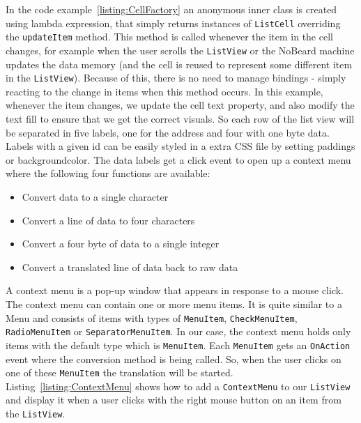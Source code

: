 In the code example~\ref{listing:CellFactory} an anonymous inner class is created using lambda expression, that simply returns instances of \texttt{ListCell} overriding the \texttt{updateItem} method. This method is called whenever the item in the cell changes, for example when the user scrolls the \texttt{ListView} or the NoBeard machine updates the data memory (and the cell is reused to represent some different item in the \texttt{ListView}). Because of this, there is no need to manage bindings - simply reacting to the change in items when this method occurs. In this example, whenever the item changes, we update the cell text property, and also modify the text fill to ensure that we get the correct visuals.
So each row of the list view will be separated in five labels, one for the address and four with one byte data. Labels with a given id can be easily styled in a extra CSS file by setting paddings or backgroundcolor. The data labels get a click event to open up a context menu where the following four functions are available:
\begin{itemize}
\item Convert data to a single character
\item Convert a line of data to four characters
\item Convert a four byte of data to a single integer
\item Convert a translated line of data back to raw data
\end{itemize}
A context menu is a pop-up window that appears in response to a mouse click. The context menu can contain one or more menu items. It is quite similar to a Menu and consists of items with types of \texttt{MenuItem}, \texttt{CheckMenuItem}, \texttt{RadioMenuItem} or \texttt{SeparatorMenuItem}. In our case, the context menu holds only items with the default type which is \texttt{MenuItem}. Each \texttt{MenuItem} gets an \texttt{OnAction} event where the conversion method is being called. So, when the user clicks on one of these \texttt{MenuItem} the translation will be started.
Listing~\ref{listing:ContextMenu} shows how to add a \texttt{ContextMenu} to our \texttt{ListView} and display it when a user clicks with the right mouse button on an item from the \texttt{ListView}. 

